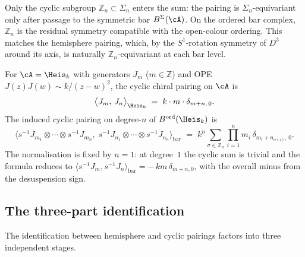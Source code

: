 \begin{remark}
\label{rem:cyclic-not-full-symmetric}
Only the cyclic subgroup $\mathbb Z_n \subset \Sigma_n$ enters
the sum: the pairing is $\Sigma_n$-equivariant only after passage
to the symmetric bar $B^\Sigma(\cA)$. On the ordered bar
complex, $\mathbb Z_n$ is the residual symmetry compatible with
the open-colour ordering. This matches the hemisphere
pairing, which, by the $S^1$-rotation symmetry of $D^3$ around
its axis, is naturally $\mathbb Z_n$-equivariant at each bar
level.
\end{remark}

\begin{computation}
\label{comp:heisenberg-cyclic-pairing}
For $\cA = \Heis_k$ with generators $J_m$ ($m\in\mathbb Z$) and
OPE $J(z)J(w)\sim k/(z-w)^2$, the cyclic chiral pairing on
$\cA$ is
\[
 \bigl\langle J_m,\, J_n\bigr\rangle_{\Heis_k}
 \;=\;
 k\cdot m\cdot \delta_{m+n,\,0}.
\]
The induced cyclic pairing on degree-$n$ of
$B^{\mathrm{ord}}(\Heis_k)$ is
\[
 \bigl\langle
 s^{-1}J_{m_1}\otimes\cdots\otimes s^{-1}J_{m_n},\;
 s^{-1}J_{n_1}\otimes\cdots\otimes s^{-1}J_{n_n}
 \bigr\rangle_{\mathrm{bar}}
 \;=\;
 k^n\sum_{\sigma\in\mathbb Z_n}
 \prod_{i=1}^n m_i\,
 \delta_{m_i + n_{\sigma(i)},\,0}.
\]
The normalisation is fixed by $n=1$: at degree~$1$ the cyclic sum
is trivial and the formula reduces to
$\langle s^{-1}J_m, s^{-1}J_n\rangle_{\mathrm{bar}} = -\,km\,
\delta_{m+n,0}$, with the overall minus from the desuspension
sign.
\end{computation}

\subsection{The three-part identification}
\label{subsec:three-part-identification}

The identification between hemisphere and cyclic pairings factors into
three independent stages.

